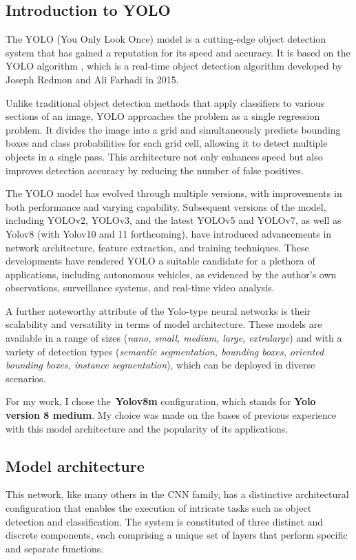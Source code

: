 
\subsection{Introduction to YOLO}\label{subsec:introduction-to-yolo}

The YOLO (You Only Look Once) model is a cutting-edge object detection system that has gained a reputation for its speed and accuracy.
It is based on the YOLO algorithm , which is a real-time object detection algorithm developed by Joseph Redmon and Ali Farhadi in 2015\cite{redmon2016lookonceunifiedrealtime}.

Unlike traditional object detection methods that apply classifiers to various sections of an image,
YOLO approaches the problem as a single regression problem.
It divides the image into a grid and simultaneously predicts bounding boxes and class probabilities for each grid cell,
allowing it to detect multiple objects in a single pass.
This architecture not only enhances speed but also improves detection accuracy by reducing the number of false positives.

The YOLO model has evolved through multiple versions, with improvements in both performance and varying capability.
Subsequent versions of the model, including YOLOv2, YOLOv3, and the latest YOLOv5 and YOLOv7, as well as Yolov8 (with Yolov10 and 11 forthcoming),
have introduced advancements in network architecture,
feature extraction, and training techniques.
These developments have rendered YOLO a suitable candidate for a plethora of applications,
including autonomous vehicles, as evidenced by the author's own observations, surveillance systems, and real-time video analysis.

A further noteworthy attribute of the Yolo-type neural networks is their scalability and versatility in terms of model architecture.
These models are available in a range of sizes (\textit{nano, small, medium, large, extralarge}) and with a variety of detection types (\textit{semantic segmentation, bounding boxes,
oriented bounding boxes, instance segmentation}), which can be deployed in diverse scenarios.

For my work, I chose the~\textbf{Yolov8m} configuration, which stands for \textbf{Yolo version 8 medium}.
My choice was made on the bases of previous experience with this model architecture and the popularity of its applications.


\subsection{Model architecture}\label{subsec:architecture}
This network, like many others in the CNN family, has a distinctive architectural configuration that
enables the execution of intricate tasks such as object detection and classification.
The system is constituted of three distinct and discrete components,
each comprising a unique set of layers that perform specific and separate functions.

